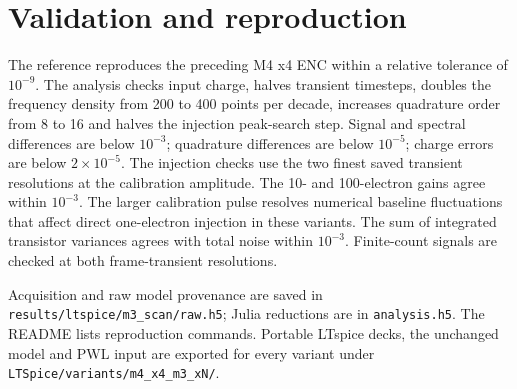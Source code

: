 \documentclass[11pt,a4paper]{article}
\begin{document}
\section*{Validation and reproduction}
The reference reproduces the preceding M4 x4 ENC within a relative tolerance
of $10^{-9}$. The analysis checks input charge, halves transient timesteps,
doubles the frequency density from 200 to 400 points per decade, increases
quadrature order from 8 to 16 and halves the injection peak-search step.
Signal and spectral differences are below $10^{-3}$; quadrature differences
are below $10^{-5}$; charge errors are below $2\times10^{-5}$.
The injection checks use the two finest saved transient resolutions at the
calibration amplitude. The 10- and 100-electron gains agree within $10^{-3}$.
The larger calibration pulse resolves numerical baseline fluctuations that
affect direct one-electron injection in these variants.
The sum of integrated transistor variances agrees with total noise within
$10^{-3}$. Finite-count signals are checked at both frame-transient resolutions.

Acquisition and raw model provenance are saved in
\texttt{results/ltspice/m3\_scan/raw.h5}; Julia reductions are in
\texttt{analysis.h5}. The README lists reproduction commands. Portable
LTspice decks, the unchanged model and PWL input are exported for every variant
under \texttt{LTSpice/variants/m4\_x4\_m3\_xN/}.
\end{document}
